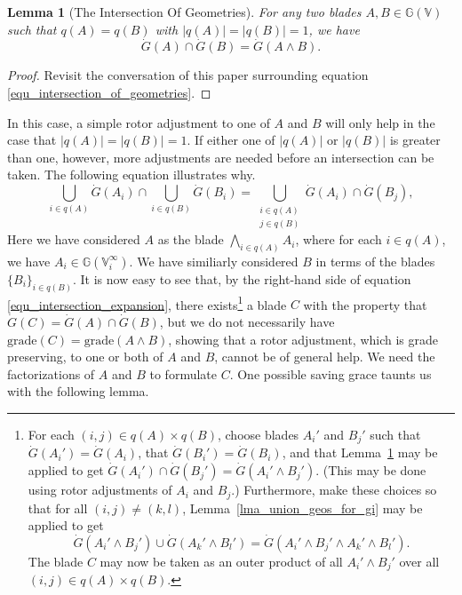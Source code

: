\documentclass{birkjour}
\newtheorem{lem}[thm]{Lemma}
\theoremstyle{definition}
\theoremstyle{remark}
\numberwithin{equation}{section}
\newcommand{\G}{\mathbb{G}}
\newcommand{\V}{\mathbb{V}}
\newcommand{\Gi}{\dot{G}}
\begin{document}
\begin{lem}[The Intersection Of Geometries]\label{lma_intersect_geos}
For any two blades $A,B\in\G(\V)$ such that $q(A)=q(B)$
with $|q(A)|=|q(B)|=1$, we have
\begin{equation}
\Gi(A)\cap\Gi(B)=\Gi(A\wedge B).
\end{equation}
\end{lem}
\begin{proof}
Revisit the conversation of this paper surrounding equation \eqref{equ_intersection_of_geometries}.
\end{proof}
In this case, a simple rotor adjustment to one of $A$ and $B$ will only help
in the case that $|q(A)|=|q(B)|=1$.  If either one of $|q(A)|$ or $|q(B)|$
is greater than one, however, more adjustments are needed before an intersection can
be taken.  The following equation illustrates why.
\begin{equation}\label{equ_intersection_expansion}
\bigcup_{i\in q(A)}\Gi(A_i)\cap\bigcup_{i\in q(B)}\Gi(B_i) =
\bigcup_{\substack{i\in q(A)\\j\in q(B)}} \Gi(A_i)\cap \Gi(B_j),
\end{equation}
Here we have considered $A$ as the blade $\bigwedge_{i\in q(A)}A_i$, where
for each $i\in q(A)$, we have $A_i\in\G(\V_i^\infty)$.  We have similiarly
considered $B$ in terms of the blades $\{B_i\}_{i\in q(B)}$.  It is now
easy to see that, by the right-hand side of equation \eqref{equ_intersection_expansion},
there exists\footnote{For each $(i,j)\in q(A)\times q(B)$, choose blades $A_i'$ and
$B_j'$ such that $\Gi(A_i')=\Gi(A_i)$, that $\Gi(B_i')=\Gi(B_i)$, and that
Lemma~\ref{lma_intersect_geos} may be applied
to get $\Gi(A_i')\cap\Gi(B_j')=\Gi(A_i'\wedge B_j')$.  (This may be done using rotor
adjustments of $A_i$ and $B_j$.)
Furthermore, make these choices so that for all $(i,j)\neq (k,l)$, Lemma~\ref{lma_union_geos_for_gi}
may be applied to get
\begin{equation*}
\Gi(A_i'\wedge B_j')\cup\Gi(A_k'\wedge B_l')=\Gi(A_i'\wedge B_j'\wedge A_k'\wedge B_l').
\end{equation*}
The blade $C$ may now be taken as an outer product of all $A_i'\wedge B_j'$
over all $(i,j)\in q(A)\times q(B)$.} a blade $C$
with the property that $\Gi(C)=\Gi(A)\cap\Gi(B)$, but we do not necessarily
have $\mbox{grade}(C)=\mbox{grade}(A\wedge B)$, showing that a rotor
adjustment, which is grade preserving, to one or both of $A$ and $B$, cannot
be of general help.  We need the factorizations of $A$ and $B$ to formulate $C$.
One possible saving grace taunts us with the following lemma.
\end{document}
